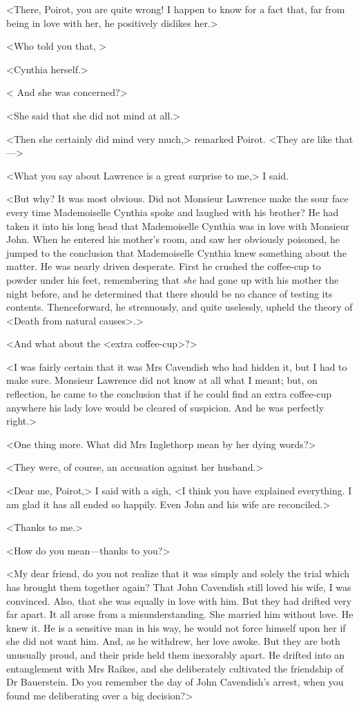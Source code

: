  <There, Poirot, you are quite wrong! I happen to know for a fact that, far from being in love with her, he positively dislikes her.> 

 <Who told you that, > 

 <Cynthia herself.> 

 < And she was concerned?> 

 <She said that she did not mind at all.> 

 <Then she certainly did mind very much,> remarked Poirot. <They are like that—> 

 <What you say about Lawrence is a great surprise to me,> I said. 

 <But why? It was most obvious. Did not Monsieur Lawrence make the sour face every time Mademoiselle Cynthia spoke and laughed with his brother? He had taken it into his long head that Mademoiselle Cynthia was in love with Monsieur John. When he entered his mother's room, and saw her obviously poisoned, he jumped to the conclusion that Mademoiselle Cynthia knew something about the matter. He was nearly driven desperate. First he crushed the coffee-cup to powder under his feet, remembering that \emph{she} had gone up with his mother the night before, and he determined that there should be no chance of testing its contents. Thenceforward, he strenuously, and quite uselessly, upheld the theory of <Death from natural causes>.> 

 <And what about the <extra coffee-cup>?> 

 <I was fairly certain that it was Mrs Cavendish who had hidden it, but I had to make sure. Monsieur Lawrence did not know at all what I meant; but, on reflection, he came to the conclusion that if he could find an extra coffee-cup anywhere his lady love would be cleared of suspicion. And he was perfectly right.> 

 <One thing more. What did Mrs Inglethorp mean by her dying words?> 

 <They were, of course, an accusation against her husband.> 

 <Dear me, Poirot,> I said with a sigh, <I think you have explained everything. I am glad it has all ended so happily. Even John and his wife are reconciled.> 

 <Thanks to me.> 

 <How do you mean—thanks to you?> 

 <My dear friend, do you not realize that it was simply and solely the trial which has brought them together again? That John Cavendish still loved his wife, I was convinced. Also, that she was equally in love with him. But they had drifted very far apart. It all arose from a misunderstanding. She married him without love. He knew it. He is a sensitive man in his way, he would not force himself upon her if she did not want him. And, as he withdrew, her love awoke. But they are both unusually proud, and their pride held them inexorably apart. He drifted into an entanglement with Mrs Raikes, and she deliberately cultivated the friendship of Dr Bauerstein. Do you remember the day of John Cavendish's arrest, when you found me deliberating over a big decision?> 

